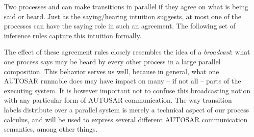 \documentclass[twocolumn]{article}
\begin{document}
Two processes  and  can make transitions in parallel if they agree on what is being said or heard. Just as the saying/hearing intuition suggests, at most one of the processes can have the saying role in such an agreement. The following set of inference rules capture this intuition formally.

The effect of these agreement rules closely resembles the idea of a \emph{broadcast}: what one process says may be heard by every other process in a large parallel composition. This behavior serves us well, because in general, what one AUTOSAR runnable does may have impact on many -- if not all -- parts of the executing system. It is however important not to confuse this broadcasting notion with any particular form of AUTOSAR communication. The way transition labels distribute over a parallel system is merely a technical aspect of our process calculus, and will be used to express several different AUTOSAR communication semantics, among other things.
\end{document}
